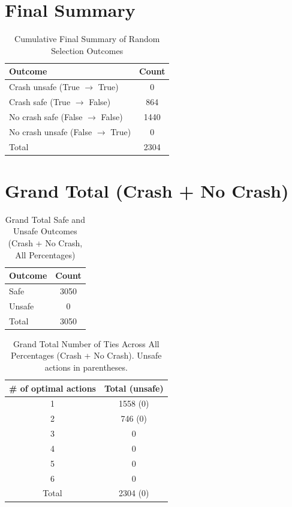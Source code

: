 \documentclass{article}
\begin{document}
\section{Final Summary}

\begin{table}[h]
\centering
\caption{Cumulative Final Summary of Random Selection Outcomes}
\begin{tabular}{lc}
\toprule
Outcome & Count \\
\midrule
Crash unsafe (True $\rightarrow$ True) & 0 \\ 
Crash safe (True $\rightarrow$ False) & 864 \\ 
No crash safe (False $\rightarrow$ False) & 1440 \\ 
No crash unsafe (False $\rightarrow$ True) & 0 \\ 
\midrule
Total & 2304 \\ 
\bottomrule
\end{tabular}
\end{table}

\section{Grand Total (Crash + No Crash)}

\begin{table}[h]
\centering
\caption{Grand Total Safe and Unsafe Outcomes (Crash + No Crash, All Percentages)}
\begin{tabular}{lc}
\toprule
Outcome & Count \\
\midrule
Safe & 3050 \\ 
Unsafe & 0 \\ 
\midrule
Total & 3050 \\ 
\bottomrule
\end{tabular}
\end{table}

\begin{table}[h]
\centering
\caption{Grand Total Number of Ties Across All Percentages (Crash + No Crash).
Unsafe actions in parentheses.}
\begin{tabular}{c|c}
\toprule
\# of optimal actions & Total (unsafe) \\
\midrule
1 & 1558 (0) \\ 
2 & 746 (0) \\ 
3 & 0 \\ 
4 & 0 \\ 
5 & 0 \\ 
6 & 0 \\ 
\midrule
Total & 2304 (0) \\ 
\bottomrule
\end{tabular}
\end{table}
\end{document}
